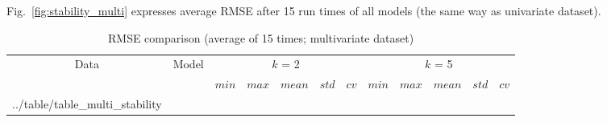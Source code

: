 \documentclass[11pt,twoside]{article}
\makeatletter
\newcommand\primitiveinput[1]
		{\@@input #1 }
\makeatother
\begin{document}
\begin{multicols}{2}
Fig.~\ref{fig:stability_multi} expresses average RMSE after 15 run times of all models (the same way as univariate dataset).

\begin{table}[!t]
	\caption{RMSE comparison (average of 15 times; multivariate dataset)}
	\label{table:multi_stability}
	\centering
	\begin{adjustbox}{width=0.45\textwidth, angle=270}
	\begin{sideways}
		\begin{tabular}{| c | c| c | c | c | c | c | c | c | c | c | c |}%
		\hline
			 \multirow{2}{*}{Data} & \multirow{2}{*}{Model} & \multicolumn{5}{c|}{$k$ = 2} & \multicolumn{5}{c|}{ $k$ = 5 } \\ 
			 \cline{3-12}
	   		& & $min$ & $max$ & $mean$ & $std$ & $cv$ &   $min$ & $max$ & $mean$ & $std$ & $cv$ \\ [0.5ex] 
		\hline
			\primitiveinput{../table/table_multi_stability}
		\hline
		\end{tabular}
	\end{sideways}
	\end{adjustbox}
\end{table}



\end{multicols}
\end{document}
